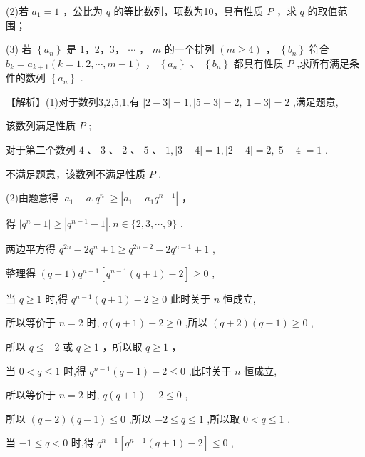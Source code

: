 \documentclass[10pt]{article}
\begin{document}
(2)若 \({a}_{1} = 1\) ，公比为 \(q\) 的等比数列，项数为10，具有性质 \(P\) ，求 \(q\) 的取值范围；

(3) 若 \(\left\{  {a}_{n}\right\}\) 是 1，2，3， \(\cdots\) ， \(m\) 的一个排列 \(\left( {m \geq  4}\right)\) ， \(\left\{  {b}_{n}\right\}\) 符合 \({b}_{k} = {a}_{k + 1}\left( {k = 1,2,\cdots ,m - 1}\right)\) ， \(\left\{  {a}_{n}\right\}  \text{ 、 }\left\{  {b}_{n}\right\}\) 都具有性质 \(P\) ,求所有满足条件的数列 \(\left\{  {a}_{n}\right\}\) .

【解析】(1)对于数列3,2,5,1,有 \(\left| {2 - 3}\right|  = 1,\left| {5 - 3}\right|  = 2,\left| {1 - 3}\right|  = 2\) ,满足题意,

该数列满足性质 \(P\) ;

对于第二个数列 \(4\text{ 、 }3\text{ 、 }2\text{ 、 }5\text{ 、 }1,\left| {3 - 4}\right|  = 1,\left| {2 - 4}\right|  = 2,\left| {5 - 4}\right|  = 1\) .

不满足题意，该数列不满足性质 \(P\) .

(2)由题意得 \(\left| {{a}_{1} - {a}_{1}{q}^{n}}\right|  \geq  \left| {{a}_{1} - {a}_{1}{q}^{n - 1}}\right|\) ，

得 \(\left| {{q}^{n} - 1}\right|  \geq  \left| {{q}^{n - 1} - 1}\right| ,n \in  \{ 2,3,\cdots ,9\}\) ,

两边平方得 \({q}^{2n} - 2{q}^{n} + 1 \geq  {q}^{{2n} - 2} - 2{q}^{n - 1} + 1\) ,

整理得 \(\left( {q - 1}\right) {q}^{n - 1}\left\lbrack  {{q}^{n - 1}\left( {q + 1}\right)  - 2}\right\rbrack   \geq  0\) ,

当 \(q \geq  1\) 时,得 \({q}^{n - 1}\left( {q + 1}\right)  - 2 \geq  0\) 此时关于 \(n\) 恒成立,

所以等价于 \(n = 2\) 时, \(q\left( {q + 1}\right)  - 2 \geq  0\) ,所以 \(\left( {q + 2}\right) \left( {q - 1}\right)  \geq  0\) ,

所以 \(q \leq   - 2\) 或 \(q \geq  1\) ，所以取 \(q \geq  1\) ，

当 \(0 < q \leq  1\) 时,得 \({q}^{n - 1}\left( {q + 1}\right)  - 2 \leq  0\) ,此时关于 \(n\) 恒成立,

所以等价于 \(n = 2\) 时, \(q\left( {q + 1}\right)  - 2 \leq  0\) ,

所以 \(\left( {q + 2}\right) \left( {q - 1}\right)  \leq  0\) ,所以 \(- 2 \leq  q \leq  1\) ,所以取 \(0 < q \leq  1\) .

当 \(- 1 \leq  q < 0\) 时,得 \({q}^{n - 1}\left\lbrack  {{q}^{n - 1}\left( {q + 1}\right)  - 2}\right\rbrack   \leq  0\) ,
\end{document}
